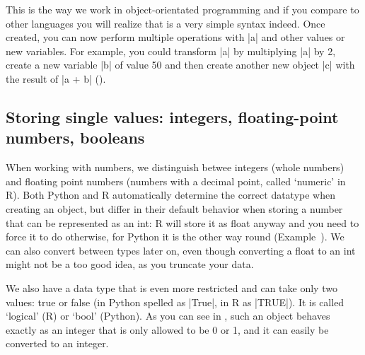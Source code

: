 This is the way we work in object-orientated programming and if you
compare to other languages you will realize that is a very simple
syntax indeed. Once created, you can now perform multiple operations
with |a| and other values or new variables. For example, you
could transform |a| by multiplying |a| by 2, create a new
variable |b| of value 50 and then create another new object
|c| with the result of |a + b| ().





\subsection{Storing single values: integers, floating-point numbers, booleans}

When working with numbers, we distinguish betwee integers (whole
numbers) and floating point numbers (numbers with a decimal point,
called `numeric' in R). Both Python and R automatically determine the
correct datatype when creating an object, but differ in their default
behavior when storing a number that can be represented as an int: R
will store it as float anyway and you need to force it to do
otherwise, for Python it is the other way round
(Example~). We can also convert between types later on,
even though converting a float to an int might not be a too good idea,
as you truncate your data.

We also have a data type that is even more restricted and can take
only two values: true or false (in Python spelled as |True|, in R as
|TRUE|). It is called `logical' (R) or `bool' (Python). As you can see
in , such an object behaves exactly as an integer that is
only allowed to be 0 or 1, and it can easily be converted to an
integer.









